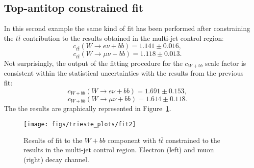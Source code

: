 \subsection{Top-antitop constrained fit}
In this second example the same kind of fit has been performed
after constraining the $t\bar{t}$ contribution to the results
obtained in the multi-jet control region:
$$c_{t\bar{t}}(W \rightarrow e \nu + bb) = 1.141 \pm 0.016 \mathrm{,}$$
$$c_{t\bar{t}}(W \rightarrow \mu \nu + bb) = 1.118 \pm 0.013 \mathrm{.}$$
Not surprisingly, the output of the fitting procedure for the
$c_{W+bb}$ scale factor is consistent within the statistical uncertainties
with the results from the previous fit:
$$c_{W+bb}(W \rightarrow e \nu + bb) = 1.691 \pm 0.153 \mathrm{,}$$
$$c_{W+bb}(W \rightarrow \mu \nu + bb) = 1.614 \pm 0.118 \mathrm{.}$$
The the results are graphically represented in Figure~\ref{fig:intermediatefit1}.
\begin{figure}[htb]
        \begin{center}
                \leavevmode
                \texttt{[image: figs/trieste\_plots/fit2]}
        \end{center}
        \caption{Results of fit to the $W + bb$ component with $t\bar{t}$ constrained to the
          results in the multi-jet control region. Electron (left) and
          muon (right) decay channel.}
        \label{fig:intermediatefit1}
\end{figure}

